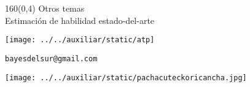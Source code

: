 \documentclass[shownotes,aspectratio=169]{beamer}
\begin{document}
\begin{frame}[plain]
\begin{textblock}{160}(0,4)
\centering \LARGE Otros temas \\
\Large Estimación de habilidad estado-del-arte
\end{textblock}
\centering \vspace{2cm}

\texttt{[image: ../../auxiliar/static/atp]}

\end{frame}


\begin{frame}[plain]
\centering

\texttt{bayesdelsur@gmail.com}

\vspace{0.5cm}

  \texttt{[image: ../../auxiliar/static/pachacuteckoricancha.jpg]}
\end{frame}
\end{document}
